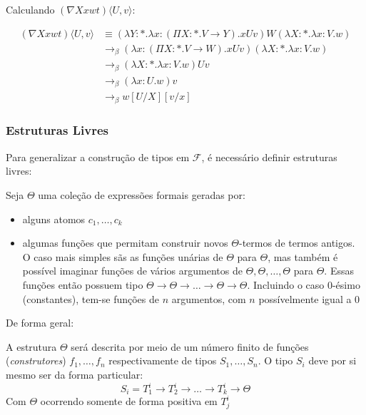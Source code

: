 \documentclass[../main.tex]{subfiles}
\begin{document}
Calculando $(\nabla X xwt)\langle U, v \rangle$:

\begin{align*}
    (\nabla X xwt)\langle U, v \rangle & \equiv (\lambda Y : \ast . \lambda x : (\Pi X : \ast . V \to Y) . xUv)W(\lambda X : \ast . \lambda x : V . w) \\
                                       & \to_{\beta} (\lambda x : (\Pi X : \ast . V \to W) . xUv)(\lambda X : \ast . \lambda x : V . w) \\
                                       & \to_{\beta} (\lambda X : \ast . \lambda x : V . w)Uv \\
                                       & \to_{\beta} (\lambda x : U . w)v \\
                                       & \to_{\beta} w[U / X][v / x]
\end{align*}

\subsubsection{Estruturas Livres}

Para generalizar a construção de tipos em $\mathcal{F}$, é necessário definir estruturas livres:

Seja $\Theta$ uma coleção de expressões formais geradas por:
\begin{itemize}
    \item alguns atomos $c_1, \dots, c_k$
    \item algumas funções que permitam construir novos $\Theta$-termos de termos antigos. O caso mais simples sãs as funções unárias de $\Theta$ para $\Theta$, mas também é possível imaginar funções de vários argumentos de $\Theta, \Theta, \dots, \Theta$ para $\Theta$. Essas funções então possuem tipo $\Theta \to \Theta \to \dots \to \Theta \to \Theta$. Incluindo o caso $0$-ésimo (constantes), tem-se funções de $n$ argumentos, com $n$ possívelmente igual a $0$
\end{itemize}

De forma geral:

\begin{definition}
    A estrutura $\Theta$ será descrita por meio de um número finito de funções (\emph{construtores}) $f_1, \dots, f_n$ respectivamente de tipos $S_1, \dots, S_n$. O tipo $S_i$ deve por si mesmo ser da forma particular:
    $$S_i = T_1^{i} \to T_2^{i} \to \dots \to T_k^{i} \to \Theta$$
    Com $\Theta$ ocorrendo somente de forma positiva em $T_j^i$
\end{definition}
\end{document}

